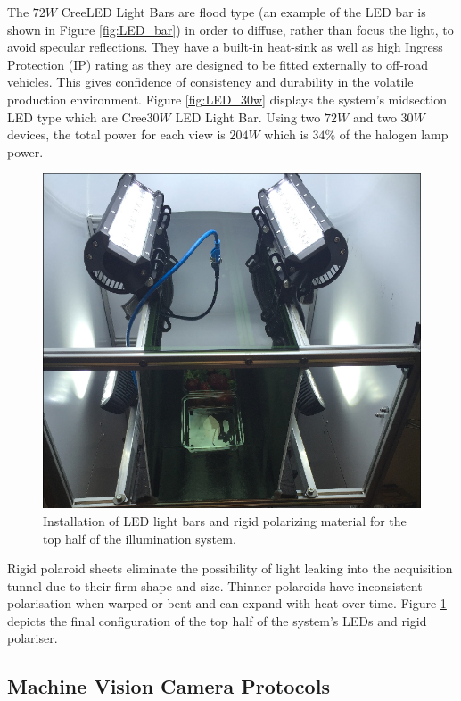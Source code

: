 \documentclass[fleqn,twoside,12pt]{report}
\begin{document}
The $72W$ Cree\textregistered LED Light Bars are flood type (an example of the LED bar is shown in Figure \ref{fig:LED_bar}) in order to diffuse, rather than focus the light, to avoid specular reflections. They have a built-in heat-sink as well as high Ingress Protection (IP) rating as they are designed to be fitted externally to off-road vehicles. This gives confidence of consistency and durability in the volatile production environment. Figure \ref{fig:LED_30w} displays the system's midsection LED type which are Cree\textregistered $30W$ LED Light Bar. Using two $72W$ and two $30W$ devices, the total power for each view is $204W$ which is $34\%$ of the halogen lamp power.



\begin{figure}[h]
	\centering
	\includegraphics[width=0.7\linewidth]{bench_led_rigid_2.png}
	\caption{Installation of LED light bars and rigid polarizing material for the top half of the illumination system.}
	\label{fig:bench_led_rigid}
\end{figure}%

Rigid polaroid sheets eliminate the possibility of light leaking into the acquisition tunnel due to their firm shape and size. Thinner polaroids have inconsistent polarisation when warped or bent and can expand with heat over time. Figure \ref{fig:bench_led_rigid} depicts the final configuration of the top half of the system's LEDs and rigid polariser.



\subsection{Machine Vision Camera Protocols}
\end{document}
